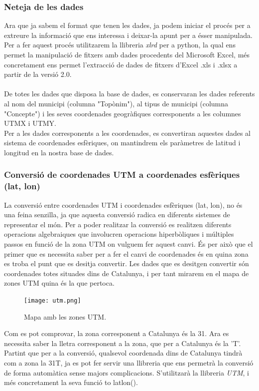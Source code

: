\documentclass[12pt,a4paper,openright,oneside]{article}
\numberwithin{equation}{section}
\theoremstyle{definition}
\begin{document}
\subsubsection*{Neteja de les dades}
Ara que ja sabem el format que tenen les dades, ja podem iniciar el procés per a extreure la informació que ens interessa i deixar-la apunt per a ésser manipulada.\\
Per a fer aquest procés utilitzarem la llibreria \emph{xlrd} per a python, la qual ens permet la manipulació de fitxers amb dades procedents del Microsoft Excel, més concretament ens permet l'extracció de dades de fitxers d'Excel .xls i .xlsx a partir de la versió 2.0.\\ \\
De totes les dades que disposa la base de dades, es conservaran les dades referents al nom del municipi (columna "Topònim"), al tipus de municipi (columna "Concepte") i les seves coordenades geogràfiques corresponents a les columnes UTMX i UTMY.\\
Per a les dades corresponents a les coordenades, es convertiran aquestes dades al sistema de coordenades esfèriques, on mantindrem els paràmetres de latitud i longitud en la nostra base de dades.
\subsubsection*{Conversió de coordenades UTM a coordenades esfèriques (lat, lon)}
La conversió entre coordenades UTM i coordenades esfèriques (lat, lon), no és una feina senzilla, ja que aquesta conversió radica en diferents sistemes de representar el món. Per a poder realitzar la conversió es realitzen diferents operacions algebraiques que involucren operacions hiperbòliques i múltiples passos en funció de la zona UTM on vulguem fer aquest canvi. És per això que el primer que es necessita saber per a fer el canvi de coordenades és en quina zona es troba el punt que es desitja convertir. Les dades que es desitgen convertir són coordenades totes situades dins de Catalunya, i per tant mirarem en el mapa de zones UTM quina és la que pertoca.
\begin{figure}[htbp]
\centering
\texttt{[image: utm.png]}
\caption{Mapa amb les zones UTM.}
\end{figure}
\newpage
Com es pot comprovar, la zona corresponent a Catalunya és la 31. Ara es necessita saber la lletra corresponent a la zona, que per a Catalunya és la 'T'.\\
Partint que per a la conversió, qualsevol coordenada dins de Catalunya tindrà com a zona la 31T, ja es pot fer servir una llibreria que ens permetrà la conversió de forma automàtica sense majors complicacions. S'utilitzarà la llibreria \emph{UTM}, i més concretament la seva funció to latlon().
\end{document}
